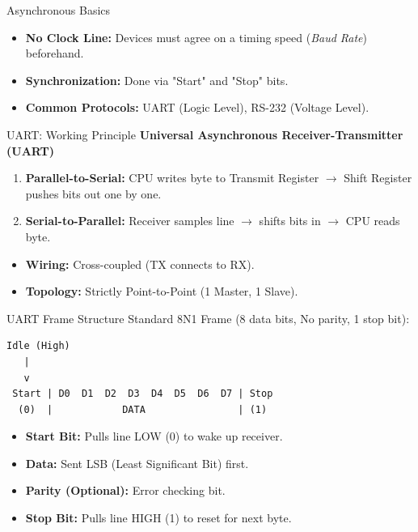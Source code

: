\begin{frame}{Asynchronous Basics}
\begin{itemize}
    \item \textbf{No Clock Line:} Devices must agree on a timing speed (\textit{Baud Rate}) beforehand.
    \item \textbf{Synchronization:} Done via "Start" and "Stop" bits.
    \item \textbf{Common Protocols:} UART (Logic Level), RS-232 (Voltage Level).
\end{itemize}
\end{frame}

\begin{frame}{UART: Working Principle}
\textbf{Universal Asynchronous Receiver-Transmitter (UART)}
\begin{enumerate}
    \item \textbf{Parallel-to-Serial:} CPU writes byte to Transmit Register $\rightarrow$ Shift Register pushes bits out one by one.
    \item \textbf{Serial-to-Parallel:} Receiver samples line $\rightarrow$ shifts bits in $\rightarrow$ CPU reads byte.
\end{enumerate}

\begin{itemize}
    \item \textbf{Wiring:} Cross-coupled (TX connects to RX).
    \item \textbf{Topology:} Strictly Point-to-Point (1 Master, 1 Slave).
\end{itemize}
\end{frame}

\begin{frame}[fragile]{UART Frame Structure}
Standard 8N1 Frame (8 data bits, No parity, 1 stop bit):

\begin{verbatim}
Idle (High)
   |
   v
 Start | D0  D1  D2  D3  D4  D5  D6  D7 | Stop
  (0)  |            DATA                | (1)
\end{verbatim}

\begin{itemize}
    \item \textbf{Start Bit:} Pulls line LOW (0) to wake up receiver.
    \item \textbf{Data:} Sent LSB (Least Significant Bit) first.
    \item \textbf{Parity (Optional):} Error checking bit.
    \item \textbf{Stop Bit:} Pulls line HIGH (1) to reset for next byte.
\end{itemize}
\end{frame}

